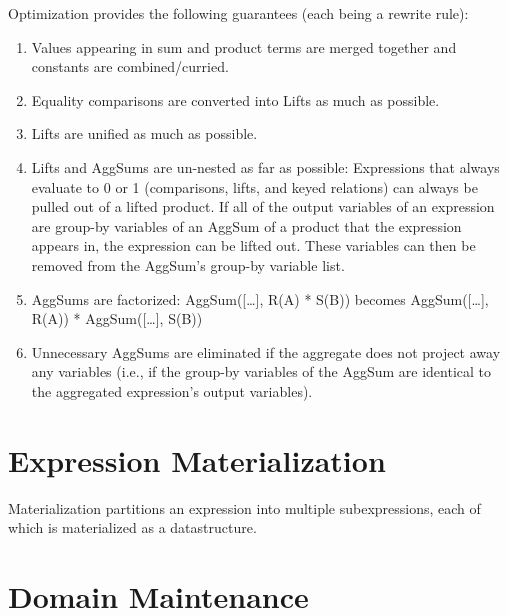 \documentclass[11pt]{amsart}
\begin{document}
Optimization provides the following guarantees (each being a rewrite rule):
\begin{enumerate}
\item Values appearing in sum and product terms are merged together and constants are combined/curried.
\item Equality comparisons are converted into Lifts as much as possible.
\item Lifts are unified as much as possible.
\item Lifts and AggSums are un-nested as far as possible: Expressions that always evaluate to 0 or 1 (comparisons, lifts, and keyed relations) can always be pulled out of a lifted product.  If all of the output variables of an expression are group-by variables of an AggSum of a product that the expression appears in, the expression can be lifted out.  These variables can then be removed from the AggSum's group-by variable list.
\item AggSums are factorized: AggSum([\ldots], R(A) * S(B)) becomes AggSum([\ldots], R(A)) * AggSum([\ldots], S(B))
\item Unnecessary AggSums are eliminated if the aggregate does not project away any variables (i.e., if the group-by variables of the AggSum are identical to the aggregated expression's output variables).
\end{enumerate}

\section{Expression Materialization}

Materialization partitions an expression into multiple subexpressions, each of which is materialized as a datastructure.  

\section{Domain Maintenance}
\end{document}
